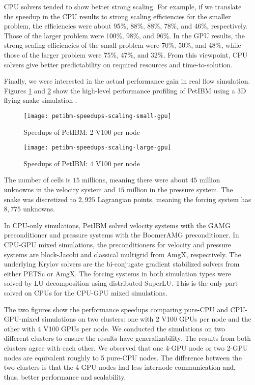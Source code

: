 CPU solvers tended to show better strong scaling.
For example, if we translate the speedup in the CPU results to strong scaling efficiencies for the smaller problem, the efficiencies were about 95\%, 88\%, 88\%, 78\%, and 46\%, respectively.
Those of the larger problem were 100\%, 98\%, and 96\%.
In the GPU results, the strong scaling efficiencies of the small problem were 70\%, 50\%, and 48\%, while those of the larger problem were 75\%, 47\%, and 32\%.
From this viewpoint, CPU solvers give better predictability on required resources and time-to-solution. 

Finally, we were interested in the actual performance gain in real flow simulation.
Figures \ref{fig:petibm-speedups-15M-small} and \ref{fig:petibm-speedups-15M-large} show the high-level performance profiling of PetIBM using a 3D flying-snake simulation \cite{krishnan_lift_2014,krishnan_cuibm_2017}.
\begin{figure}[hbt!]
    \texttt{[image: petibm-speedups-scaling-small-gpu]}
    \caption{Speedups of PetIBM: 2 V100 per node}
    \label{fig:petibm-speedups-15M-small}
\end{figure}
\begin{figure}[hbt!]
    \texttt{[image: petibm-speedups-scaling-large-gpu]}
    \caption{Speedups of PetIBM: 4 V100 per node}
    \label{fig:petibm-speedups-15M-large}
\end{figure}
The number of cells is $15$ millions, meaning there were about $45$ million unknowns in the velocity system and $15$ million in the pressure system.
The snake was discretized to $2,925$ Lagrangian points, meaning the forcing system has $8,775$ unknowns.

In CPU-only simulations, PetIBM solved velocity systems with the GAMG preconditioner and pressure systems with the BoomerAMG preconditioner.
In CPU-GPU mixed simulations, the preconditioners for velocity and pressure systems are block-Jacobi and classical multigrid from AmgX, respectively.
The underlying Krylov solvers are the bi-conjugate gradient stabilized solvers from either PETSc or AmgX.
The forcing systems in both simulation types were solved by LU decomposition using distributed SuperLU.
This is the only part solved on CPUs for the CPU-GPU mixed simulations.

The two figures show the performance speedups comparing pure-CPU and CPU-GPU-mixed simulations on two clusters: one with 2 V100 GPUs per node and the other with 4 V100 GPUs per node.
We conducted the simulations on two different clusters to ensure the results have generalizability.
The results from both clusters agree with each other.
We observed that one 4-GPU node or two 2-GPU nodes are equivalent roughly to 5 pure-CPU nodes.
The difference between the two clusters is that the 4-GPU nodes had less internode communication and, thus, better performance and scalability.
